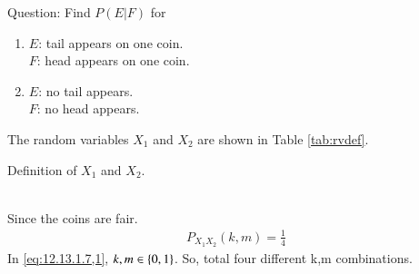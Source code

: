 \documentclass[journal,11pt,twocolumn]{IEEEtran}
\begin{document}
Question: Find $P(E|F)$ for
\begin{enumerate}
\item$E$: tail appears on one coin.\\
   $F$: head appears on one coin.
\item$E$: no tail appears.\\
    $F$: no head appears.
\end{enumerate}
\solution 
The random variables $X_1$ and $X_2$ are shown in Table \ref{tab:rvdef}.
\begin{table}[!ht]
\centering

\caption{Definition of $X_1$ and $X_2$.}
\label{tab:rvdef}
\end{table}\\
    Since the coins are fair.
\begin{align}
P_{X_1X_2}(k,m)=\frac{1}{4}
\label{eq:12.13.1.7,1}
\end{align}
In \eqref{eq:12.13.1.7,1}, $k,m \in \left\{0,1\right\}$. So, total four different k,m combinations.
\end{document}
